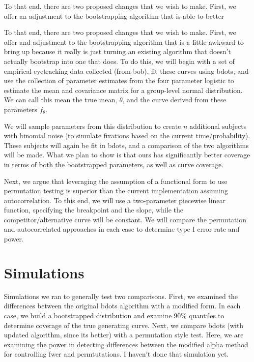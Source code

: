 \documentclass{article}
\begin{document}
To that end, there are two proposed changes that we wish to make. First, we offer an adjustment to the bootstrapping algorithm that is able to better

To that end, there are two proposed changes that we wish to make. First, we offer and adjustment to the bootstrapping algorithm that is a little awkward to bring up because it really is just turning an existing algorithm that doesn't actually bootstrap into one that does. To do this, we will begin with a set of empirical eyetracking data collected (from bob), fit these curves using bdots, and use the collection of parameter estimates from the four parameter logistic to estimate the mean and covariance matrix for a group-level normal distribution. We can call this mean the true mean, $\theta$, and the curve derived from these parameters $f_{\theta}$.

We will sample parameters from this distribution to create $n$ additional subjects with binomial noise (to simulate fixations based on the current time/probability). These subjects will again be fit in bdots, and a comparison of the two algorithms will be made. What we plan to show is that ours has significantly better coverage in terms of both the bootstrapped parameters, as well as curve coverage.

Next, we argue that leveraging the assumption of a functional form to use permutation testing is superior than the current implementation assuming autocorrelation. To this end, we will use a two-parameter piecewise linear function, specifying the breakpoint and the slope, while the competitor/alternative curve will be constant. We will compare the permutation and autocorrelated approaches in each case to determine type I error rate and power. 

\section{Simulations}

Simulations we ran to generally test two comparisons. First, we examined the differences between the original bdots algorithm with a modified form. In each case, we build a bootstrapped distribution and examine 90\% quantiles to determine coverage of the true generating curve. Next, we compare bdots (with updated algorithm, since its better) with a permutation style test. Here, we are examining the power in detecting differences between the modified alpha method for controlling fwer and permtutations. I haven't done that simulation yet.
\end{document}
